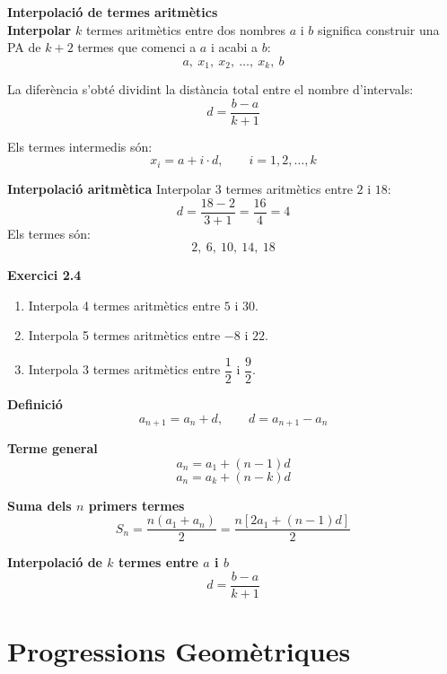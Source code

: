 \documentclass[12pt]{article}
\begin{document}
\begin{concept}
\textbf{Interpolació de termes aritmètics}\\
\textbf{Interpolar} $k$ termes aritmètics entre dos nombres $a$ i $b$ significa construir una PA de $k+2$ termes que comenci a $a$ i acabi a $b$:
\[
a, \ x_1, \ x_2, \ \dots, \ x_k, \ b
\]

La diferència s'obté dividint la distància total entre el nombre d'intervals:
\[
\boxed{d = \dfrac{b - a}{k + 1}}
\]

Els termes intermedis són:
\[
x_i = a + i \cdot d, \qquad i = 1, 2, \dots, k
\]
\end{concept}

\begin{exemple}
\textbf{Interpolació aritmètica}
Interpolar 3 termes aritmètics entre $2$ i $18$:
\[
d = \dfrac{18-2}{3+1} = \dfrac{16}{4} = 4
\]
Els termes són:
\[
2, \ 6, \ 10, \ 14, \ 18
\]
\end{exemple}

\begin{exercici}
\textbf{Exercici 2.4}\\
\begin{enumerate}[label=\alph*)]
    \item Interpola 4 termes aritmètics entre $5$ i $30$.
    \item Interpola 5 termes aritmètics entre $-8$ i $22$.
    \item Interpola 3 termes aritmètics entre $\dfrac{1}{2}$ i $\dfrac{9}{2}$.
\end{enumerate}
\end{exercici}

\begin{resum}[title=Resum 2: Progressions Aritmètiques]
\textbf{Definició}
\[
a_{n+1} = a_n + d, \qquad d = a_{n+1} - a_n
\]

\textbf{Terme general}
\[
a_n = a_1 + (n-1)d
\]
\[
a_n = a_k + (n-k)d
\]

\textbf{Suma dels $n$ primers termes}
\[
S_n = \dfrac{n(a_1 + a_n)}{2} = \dfrac{n\left[2a_1 + (n-1)d\right]}{2}
\]

\textbf{Interpolació de $k$ termes entre $a$ i $b$}
\[
d = \dfrac{b-a}{k+1}
\]
\end{resum}

\newpage

\section{Progressions Geomètriques}
\end{document}
